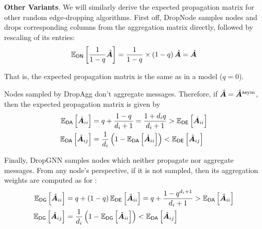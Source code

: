 \textbf{Other Variants}. We will similarly derive the expected propagation matrix for other random edge-dropping algorithms. First off, DropNode \citep{feng2020dropnode} samples nodes and drops corresponding columns from the aggregation matrix directly, followed by rescaling of its entries: 
\begin{align}
\begin{split}
    \mathbb{E}_{\mathsf{DN}}\left[\frac{1}{1-q}\hat{\bm{A}}\right] = \frac{1}{1-q} \times \left(1-q\right) \hat{\bm{A}} = \hat{\bm{A}}
\end{split} \label{eqn:dropnode}
\end{align}

That is, the expected propagation matrix is the same as in a  model ($q=0$). 

Nodes sampled by DropAgg \cite{jiang2023dropagg} don't aggregate messages. Therefore, if $\hat{\bm{A}} = \hat{\bm{A}}^{\text{asym}}$, then the expected propagation matrix is given by
\begin{align}
\begin{split}
    \mathbb{E}_{\mathsf{DA}}\left[\hat{\bm{A}}_{ii}\right] &= q + \frac{1-q}{d_i+1} = \frac{1+d_iq}{d_i+1} > \mathbb{E}_{\mathsf{DE}}\left[\hat{\bm{A}}_{ii}\right] \\
    \mathbb{E}_{\mathsf{DA}}\left[\hat{\bm{A}}_{ij}\right] &= \frac{1}{d_i}\left(1-\mathbb{E}_{\mathsf{DA}}\left[\hat{\bm{A}}_{ii}\right]\right) < \mathbb{E}_{\mathsf{DE}}\left[\hat{\bm{A}}_{ij}\right]
\end{split}
\label{eqn:dropagg}
\end{align}

Finally, DropGNN \citep{papp2021dropgnn} samples nodes which neither propagate nor aggregate messages. From any node's perspective, if it is not sampled, then its aggregation weights are computed as for :
\begin{align}
\begin{split}
    \mathbb{E}_{\mathsf{DG}}\left[\hat{\bm{A}}_{ii}\right] &= q + \left(1-q\right) \mathbb{E}_{\mathsf{DE}}\left[\hat{\bm{A}}_{ii}\right] = q + \frac{1-q^{d_i+1}}{d_i+1} > \mathbb{E}_{\mathsf{DA}}\left[\hat{\bm{A}}_{ii}\right] \\
    \mathbb{E}_{\mathsf{DG}}\left[\hat{\bm{A}}_{ij}\right] &= \frac{1}{d_i}\left(1-\mathbb{E}_{\mathsf{DG}}\left[\hat{\bm{A}}_{ii}\right]\right) < \mathbb{E}_{\mathsf{DA}}\left[\hat{\bm{A}}_{ij}\right]
\end{split}
\label{eqn:dropgnn}
\end{align}

